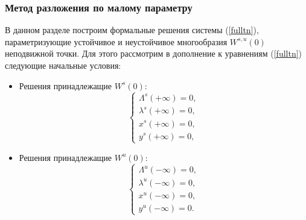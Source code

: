 \subsubsection{Метод разложения по малому параметру}
    В данном разделе построим формальные решения системы (\ref{fulltn}), параметризующие устойчивое и неустойчивое многообразия $W^{s,u}(0)$ неподвижной точки. Для этого рассмотрим в дополнение к уравнениям (\ref{fulltn}) следующие начальные условия:
    
\begin{itemize}
\item Решения принадлежащие $W^s(0)$:
\begin{equation*}
    \begin{cases}
        \Lambda^{s}(+ \infty) = 0, \\
        \lambda^{s}(+ \infty) = 0,\\
        x^{s}(+ \infty) = 0, \\
        y^{s}(+ \infty) = 0,
    \end{cases}
    \label{border}
\end{equation*}
\item Решения принадлежащие $W^u(0)$:
\begin{equation*}
    \begin{cases}
        \Lambda^{u}(- \infty) = 0, \\
        \lambda^{u}(- \infty) = 0,\\
        x^{u}(- \infty) = 0, \\
        y^{u}(- \infty) = 0.
    \end{cases}
\end{equation*}
\end{itemize}

   

